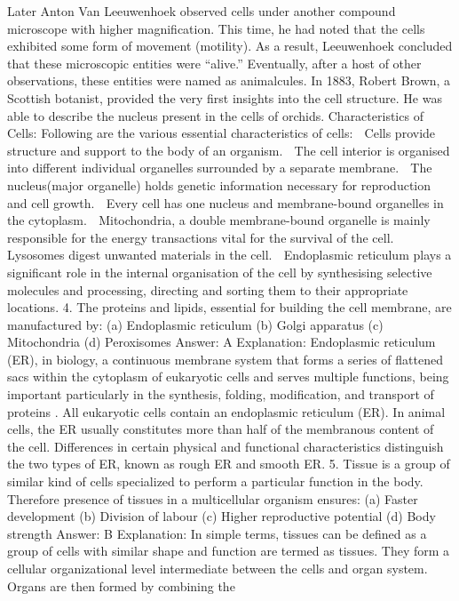 Later Anton Van Leeuwenhoek observed cells under another
compound microscope with higher magnification. This time, he had
noted that the cells exhibited some form of movement (motility). As
a result, Leeuwenhoek concluded that these microscopic entities
were “alive.” Eventually, after a host of other observations, these
entities were named as animalcules.
In 1883, Robert Brown, a Scottish botanist, provided the very first
insights into the cell structure. He was able to describe the nucleus
present in the cells of orchids.
Characteristics of Cells:
Following are the various essential characteristics of cells:
 Cells provide structure and support to the body of an organism.
 The cell interior is organised into different individual
organelles surrounded by a separate membrane.
 The nucleus(major organelle) holds genetic information
necessary for reproduction and cell growth.
 Every cell has one nucleus and membrane-bound organelles in
the cytoplasm.
 Mitochondria, a double membrane-bound organelle is mainly
responsible for the energy transactions vital for the survival
of the cell.
 Lysosomes digest unwanted materials in the cell.
 Endoplasmic reticulum plays a significant role in the internal
organisation of the cell by synthesising selective molecules and
processing, directing and sorting them to their appropriate
locations.
4. The proteins and lipids, essential for building the cell
membrane, are manufactured by:
(a) Endoplasmic reticulum
(b) Golgi apparatus
(c) Mitochondria
(d) Peroxisomes
Answer: A
Explanation: Endoplasmic reticulum (ER), in biology, a
continuous membrane system that forms a series of flattened sacs
within the cytoplasm of eukaryotic cells and serves multiple
functions, being important particularly in the synthesis, folding,
modification, and transport of proteins . All eukaryotic cells contain
an endoplasmic reticulum (ER). In animal cells, the ER
usually constitutes more than half of the membranous content of
the cell. Differences in certain physical and functional
characteristics distinguish the two types of ER, known as rough ER
and smooth ER.
5. Tissue is a group of similar kind of cells specialized to
perform a particular function in the body. Therefore presence of
tissues in a multicellular organism ensures:
(a) Faster development
(b) Division of labour
(c) Higher reproductive potential
(d) Body strength
Answer: B
Explanation: In simple terms, tissues can be defined as a group of
cells with similar shape and function are termed as tissues. They
form a cellular organizational level intermediate between the cells
and organ system. Organs are then formed by combining the
